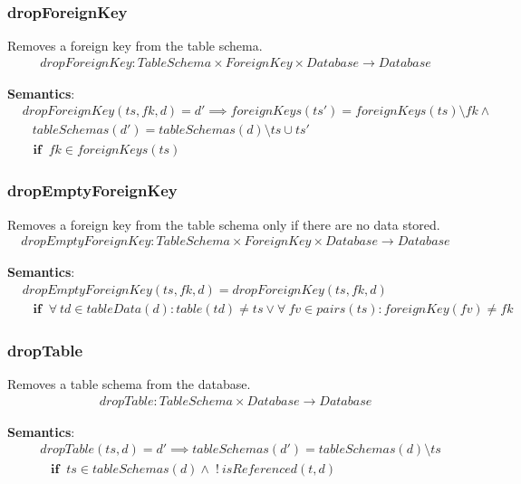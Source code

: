 \documentclass[10pt]{article}
\begin{document}
\subsubsection{dropForeignKey}
Removes a foreign key from the table schema.
\begin{align}
dropForeignKey: TableSchema \times ForeignKey \times Database \rightarrow Database
\end{align}

\noindent \textbf{Semantics}:
\begin{align}
& dropForeignKey(ts, fk, d) = d' \implies foreignKeys(ts') = foreignKeys(ts) \setminus fk \land \nonumber \\
& \;\;\ tableSchemas(d') = tableSchemas(d) \setminus ts \cup ts'  \nonumber \\
& \;\;\; \mathbf{if}  \;\; fk \in foreignKeys(ts)
\end{align}

\subsubsection{dropEmptyForeignKey}
Removes a foreign key from the table schema only if there are no data stored.
\begin{align}
dropEmptyForeignKey: TableSchema \times ForeignKey \times Database \rightarrow Database
\end{align}

\noindent \textbf{Semantics}:
\begin{align}
& dropEmptyForeignKey(ts, fk, d) = dropForeignKey(ts, fk, d) \nonumber \\
& \;\;\; \mathbf{if}  \;\;  \forall \: td \in tableData(d) : table(td) \neq ts \lor \forall \: fv \in pairs(ts) : foreignKey(fv) \neq fk
\end{align}

\subsubsection{dropTable}
Removes a table schema from the database.
\begin{align}
dropTable: TableSchema \times Database \rightarrow Database
\end{align}

\noindent \textbf{Semantics}:
\begin{align}
& dropTable(ts, d) = d' \implies tableSchemas(d') = tableSchemas(d) \setminus ts  \nonumber \\
& \;\;\; \mathbf{if}  \;\; ts \in tableSchemas(d) \land \; ! \: isReferenced(t, d)
\end{align}
\end{document}
